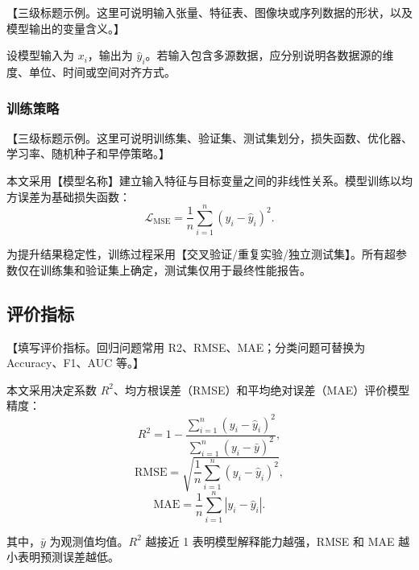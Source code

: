 【三级标题示例。这里可说明输入张量、特征表、图像块或序列数据的形状，以及模型输出的变量含义。】

设模型输入为 $x_i$，输出为 $\hat{y}_i$。若输入包含多源数据，应分别说明各数据源的维度、单位、时间或空间对齐方式。

\subsubsection{训练策略}

【三级标题示例。这里可说明训练集、验证集、测试集划分，损失函数、优化器、学习率、随机种子和早停策略。】

本文采用【模型名称】建立输入特征与目标变量之间的非线性关系。模型训练以均方误差为基础损失函数：
\begin{equation}
\mathcal{L}_{\mathrm{MSE}} = \frac{1}{n}\sum_{i=1}^{n}(y_i-\hat{y}_i)^2.
\end{equation}

为提升结果稳定性，训练过程采用【交叉验证/重复实验/独立测试集】。所有超参数仅在训练集和验证集上确定，测试集仅用于最终性能报告。

\subsection{评价指标}

【填写评价指标。回归问题常用 R2、RMSE、MAE；分类问题可替换为 Accuracy、F1、AUC 等。】

本文采用决定系数 $R^2$、均方根误差（RMSE）和平均绝对误差（MAE）评价模型精度：
\begin{equation}
R^2 = 1 - \frac{\sum_{i=1}^{n}(y_i-\hat{y}_i)^2}{\sum_{i=1}^{n}(y_i-\bar{y})^2},
\end{equation}
\begin{equation}
\mathrm{RMSE} = \sqrt{\frac{1}{n}\sum_{i=1}^{n}(y_i-\hat{y}_i)^2},
\end{equation}
\begin{equation}
\mathrm{MAE} = \frac{1}{n}\sum_{i=1}^{n}|y_i-\hat{y}_i|.
\end{equation}

其中，$\bar{y}$ 为观测值均值。$R^2$ 越接近 1 表明模型解释能力越强，RMSE 和 MAE 越小表明预测误差越低。
